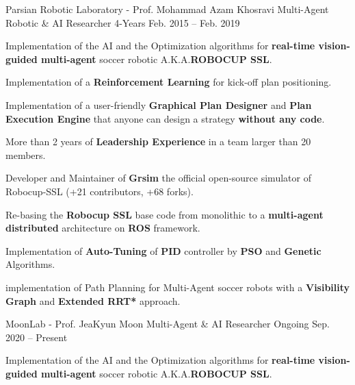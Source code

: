 

\begin{cventries}


  \cventry
    {Parsian Robotic Laboratory - Prof. Mohammad Azam Khosravi} %
    {Multi-Agent Robotic \& AI Researcher} %
    {4-Years} %
    {Feb. 2015 -- Feb. 2019} %
    {
      \begin{cvitems} %
        \item Implementation of the AI and the Optimization algorithms for \textbf{real-time vision-guided multi-agent} soccer robotic A.K.A.\textbf{ROBOCUP SSL}.
        \item Implementation of a \textbf{Reinforcement Learning} for kick-off plan positioning.
        \item Implementation of a user-friendly \textbf{Graphical Plan Designer} and \textbf{Plan Execution Engine} that anyone can design a strategy \textbf{without any code}.
        \item More than 2 years of \textbf{Leadership Experience} in a team larger than 20 members.
        \item Developer and Maintainer of \textbf{Grsim} the official open-source simulator of Robocup-SSL (+21 contributors, +68 forks).
        \item Re-basing the \textbf{Robocup SSL} base code from monolithic  to a \textbf{multi-agent distributed} architecture on \textbf{ROS} framework.
        \item Implementation of \textbf{Auto-Tuning} of \textbf{PID} controller by \textbf{PSO} and \textbf{Genetic} Algorithms.
        \item implementation of Path Planning for Multi-Agent soccer robots with a \textbf{Visibility Graph} and \textbf{Extended RRT*} approach.
      \end{cvitems}
    }

  \cventry
    {MoonLab - Prof. JeaKyun Moon} %
    {Multi-Agent \& AI Researcher} %
    {Ongoing} %
    {Sep. 2020 -- Present} %
    {
      \begin{cvitems} %
        \item Implementation of the AI and the Optimization algorithms for \textbf{real-time vision-guided multi-agent} soccer robotic A.K.A.\textbf{ROBOCUP SSL}.
      \end{cvitems}
    }



\end{cventries}
